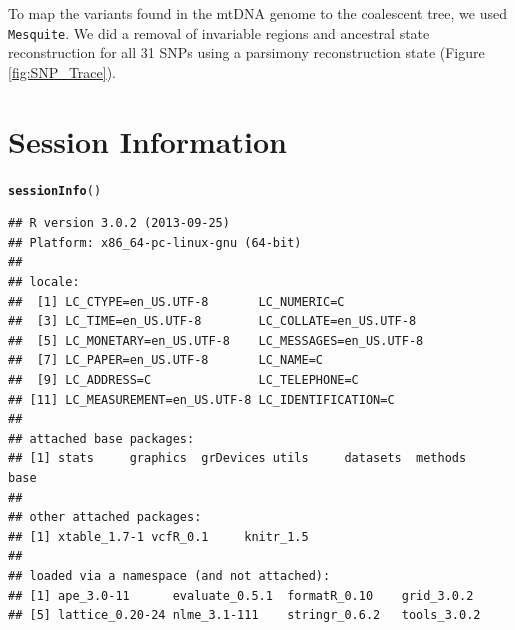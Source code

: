 \documentclass{article}\usepackage[]{graphicx}\usepackage[]{color}
\makeatletter
\newcommand{\hlstd}[1]{\textcolor[rgb]{0.345,0.345,0.345}{#1}}%
\newcommand{\hlkwd}[1]{\textcolor[rgb]{0.737,0.353,0.396}{\textbf{#1}}}%
\newenvironment{kframe}{%
 \def\at@end@of@kframe{}%
 \ifinner\ifhmode%
  \def\at@end@of@kframe{\end{minipage}}%
  \begin{minipage}{\columnwidth}%
 \fi\fi%
 \def\FrameCommand##1{\hskip\@totalleftmargin \hskip-\fboxsep
 \colorbox{shadecolor}{##1}\hskip-\fboxsep
     \hskip-\linewidth \hskip-\@totalleftmargin \hskip\columnwidth}%
 \MakeFramed {\advance\hsize-\width
   \@totalleftmargin\z@ \linewidth\hsize
   \@setminipage}}%
 {\par\unskip\endMakeFramed%
 \at@end@of@kframe}
\newenvironment{knitrout}{}{} %
\makeatother
\begin{document}
To map the variants found in the mtDNA genome to the coalescent tree, we used \texttt{Mesquite}. We did a removal of invariable regions and ancestral state reconstruction for all 31 SNPs using a parsimony reconstruction state (Figure \ref{fig:SNP_Trace}).

\newpage






\vspace{24pt}


\section{Session Information}

\begin{knitrout}
\color{fgcolor}\begin{kframe}
\begin{alltt}
\hlkwd{sessionInfo}\hlstd{()}
\end{alltt}
\begin{verbatim}
## R version 3.0.2 (2013-09-25)
## Platform: x86_64-pc-linux-gnu (64-bit)
## 
## locale:
##  [1] LC_CTYPE=en_US.UTF-8       LC_NUMERIC=C              
##  [3] LC_TIME=en_US.UTF-8        LC_COLLATE=en_US.UTF-8    
##  [5] LC_MONETARY=en_US.UTF-8    LC_MESSAGES=en_US.UTF-8   
##  [7] LC_PAPER=en_US.UTF-8       LC_NAME=C                 
##  [9] LC_ADDRESS=C               LC_TELEPHONE=C            
## [11] LC_MEASUREMENT=en_US.UTF-8 LC_IDENTIFICATION=C       
## 
## attached base packages:
## [1] stats     graphics  grDevices utils     datasets  methods   base     
## 
## other attached packages:
## [1] xtable_1.7-1 vcfR_0.1     knitr_1.5   
## 
## loaded via a namespace (and not attached):
## [1] ape_3.0-11      evaluate_0.5.1  formatR_0.10    grid_3.0.2     
## [5] lattice_0.20-24 nlme_3.1-111    stringr_0.6.2   tools_3.0.2
\end{verbatim}
\end{kframe}
\end{knitrout}






\end{document}
